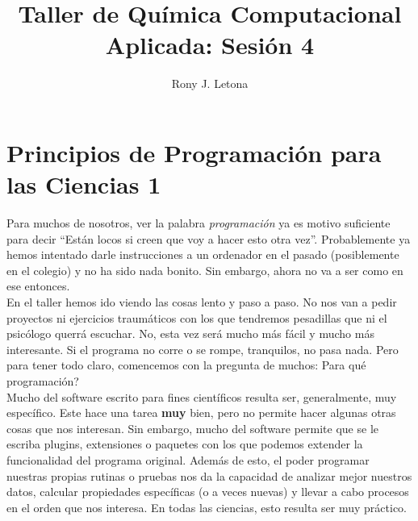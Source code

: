 \documentclass[10pt,letterpaper]{article}
\author{Rony J. Letona}
\title{Taller de Qu\'imica Computacional Aplicada: Sesi\'on 4}
\begin{document}
\maketitle

\section{Principios de Programaci\'on para las Ciencias 1}
Para muchos de nosotros, ver la palabra \emph{programaci\'on} ya es motivo suficiente para decir ``Est\'an locos si creen que voy a hacer esto otra vez''. Probablemente ya hemos intentado darle instrucciones a un ordenador en el pasado (posiblemente en el colegio) y no ha sido nada bonito. Sin embargo, ahora no va a ser como en ese entonces.\\

En el taller hemos ido viendo las cosas lento y paso a paso. No nos van a pedir proyectos ni ejercicios traum\'aticos con los que tendremos pesadillas que ni el psic\'ologo querr\'a escuchar. No, esta vez ser\'a mucho m\'as f\'acil y mucho m\'as interesante. Si el programa no corre o se rompe, tranquilos, no pasa nada. Pero para tener todo claro, comencemos con la pregunta de muchos: Para qu\'e programaci\'on?\\

Mucho del software escrito para fines cient\'ificos resulta ser, generalmente, muy espec\'ifico. Este hace una tarea \textbf{muy} bien, pero no permite hacer algunas otras cosas que nos interesan. Sin embargo, mucho del software permite que se le escriba plugins, extensiones o paquetes con los que podemos extender la funcionalidad del programa original. Adem\'as de esto, el poder programar nuestras propias rutinas o pruebas nos da la capacidad de analizar mejor nuestros datos, calcular propiedades espec\'ificas (o a veces nuevas) y llevar a cabo procesos en el orden que nos interesa. En todas las ciencias, esto resulta ser muy pr\'actico.\\
\end{document}
